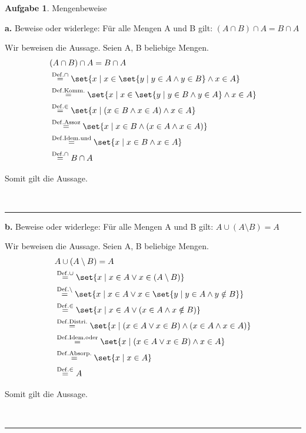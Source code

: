 \documentclass[10pt,leqno ]{article}
\DeclarePairedDelimiter\set\{\}
\theoremstyle{definition}
\newtheorem{problem}[theorem]{Aufgabe}
\newenvironment{solution}[1][L]{\begin{doublespace}\textbf{#1.}\quad }{\ \rule{0.5em}{0.5em}\end{doublespace}}
\begin{document}
\begin{problem}
Mengenbeweise
\end{problem}

\begin{solution}[a]
Beweise oder widerlege: Für alle Mengen A und B gilt: \( (A \cap B) \cap A = B \cap A \)

Wir beweisen die Aussage. Seien A, B beliebige Mengen.
\begin{align*}
    & (A \cap B) \cap A = B \cap A \\
    & \overset{\mathrm{Def. \cap}}{=} \set{x \mid x \in \set{y \mid y \in A \land y \in B} \land x \in A} \\
    & \overset{\mathrm{Def. Komm.}}{=} \set{x \mid x \in \set{y \mid y \in B \land y \in A} \land x \in A} \\
    & \overset{\mathrm{Def. \in}}{=} \set{x \mid (x \in B \land x \in A) \land x \in A} \\
    & \overset{\mathrm{Def. Assoz}}{=} \set{x \mid x \in B \land (x \in A \land x \in A)} \\
    & \overset{\mathrm{Def. Idem. und}}{=} \set{x \mid x \in B \land x \in A} \\
    & \overset{\mathrm{Def. \cap}}{=} B \cap A \\
\end{align*}

Somit gilt die Aussage.

\end{solution}

\begin{solution}[b]
Beweise oder widerlege: Für alle Mengen A und B gilt: \( A \cup (A \setminus B ) = A  \)

Wir beweisen die Aussage. Seien A, B beliebige Mengen.
\begin{align*}
    & A \cup (A \setminus B ) = A \\
    & \overset{\mathrm{Def. \cup}}{=} \set{x \mid x \in A \lor x \in (A \setminus B)} \\
    & \overset{\mathrm{Def. \setminus}}{=} \set{x \mid x \in A \lor x \in \set{y \mid y \in A \land y \notin B}} \\
    & \overset{\mathrm{Def. \in}}{=} \set{x \mid x \in A \lor (x \in A \land x \notin B)} \\
    & \overset{\mathrm{Def. Distri.}}{=} \set{x \mid (x \in A \lor x \in B) \land (x \in A \land x \in A)} \\
    & \overset{\mathrm{Def. Idem. oder}}{=} \set{x \mid (x \in A \lor x \in B) \land x \in A} \\
    & \overset{\mathrm{Def. Absorp.}}{=} \set{x \mid x \in A} \\
    & \overset{\mathrm{Def. \in}}{=} A \\
\end{align*}

Somit gilt die Aussage.

\end{solution}
\end{document}
